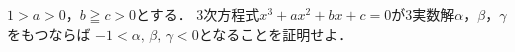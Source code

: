 \documentclass[../../main.tex]{subfiles}
\begin{document}
$1>a>0$，$b \geqq c>0$とする．
3次方程式$x^3+ax^2+bx+c=0$が3実数解$\alpha$，$\beta$，$\gamma$をもつならば
$-1<\alpha, \, \beta, \, \gamma<0$となることを証明せよ．
\end{document}
